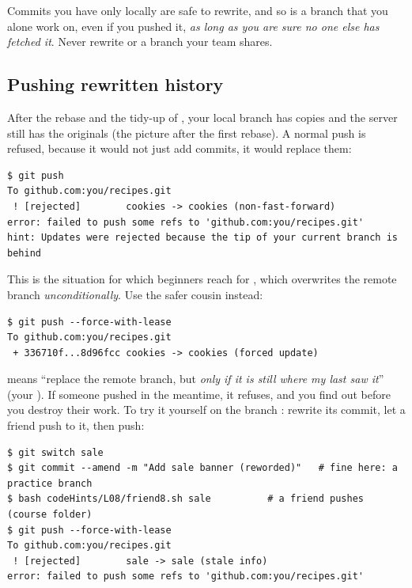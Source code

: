 Commits you have only locally are safe to rewrite, and so is a branch that you alone work on, even if you pushed it, \emph{as long as you are sure no one else has fetched it}. Never rewrite  or a branch your team shares.

\subsection{Pushing rewritten history}

After the rebase and the tidy-up of , your local branch has copies and the server still has the originals (the picture after the first rebase). A normal push is refused, because it would not just add commits, it would replace them:

\begin{lstlisting}
$ git push
To github.com:you/recipes.git
 ! [rejected]        cookies -> cookies (non-fast-forward)
error: failed to push some refs to 'github.com:you/recipes.git'
hint: Updates were rejected because the tip of your current branch is behind
\end{lstlisting}

This is the situation for which beginners reach for , which overwrites the remote branch \emph{unconditionally}. Use the safer cousin instead:

\begin{lstlisting}
$ git push --force-with-lease
To github.com:you/recipes.git
 + 336710f...8d96fcc cookies -> cookies (forced update)
\end{lstlisting}

\textbf{} means ``replace the remote branch, but \emph{only if it is still where my last  saw it}'' (your ). If someone pushed in the meantime, it refuses, and you find out before you destroy their work. To try it yourself on the branch : rewrite its commit, let a friend push to it, then push:

\begin{lstlisting}
$ git switch sale
$ git commit --amend -m "Add sale banner (reworded)"   # fine here: a practice branch
$ bash codeHints/L08/friend8.sh sale          # a friend pushes (course folder)
$ git push --force-with-lease
To github.com:you/recipes.git
 ! [rejected]        sale -> sale (stale info)
error: failed to push some refs to 'github.com:you/recipes.git'
\end{lstlisting}

